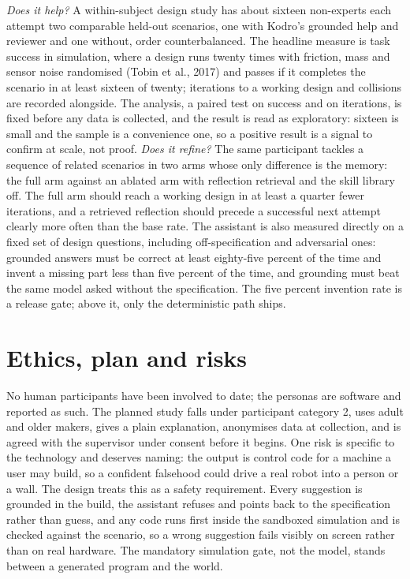 \documentclass[10.5pt]{article}
\begin{document}
\emph{Does it help?} A within-subject design study has about sixteen non-experts each attempt two comparable held-out scenarios, one with Kodro's grounded help and reviewer and one without, order counterbalanced. The headline measure is task success in simulation, where a design runs twenty times with friction, mass and sensor noise randomised (Tobin et al., 2017) and passes if it completes the scenario in at least sixteen of twenty; iterations to a working design and collisions are recorded alongside. The analysis, a paired test on success and on iterations, is fixed before any data is collected, and the result is read as exploratory: sixteen is small and the sample is a convenience one, so a positive result is a signal to confirm at scale, not proof. \emph{Does it refine?} The same participant tackles a sequence of related scenarios in two arms whose only difference is the memory: the full arm against an ablated arm with reflection retrieval and the skill library off. The full arm should reach a working design in at least a quarter fewer iterations, and a retrieved reflection should precede a successful next attempt clearly more often than the base rate. The assistant is also measured directly on a fixed set of design questions, including off-specification and adversarial ones: grounded answers must be correct at least eighty-five percent of the time and invent a missing part less than five percent of the time, and grounding must beat the same model asked without the specification. The five percent invention rate is a release gate; above it, only the deterministic path ships.

\section{Ethics, plan and risks}
No human participants have been involved to date; the personas are software and reported as such. The planned study falls under participant category 2, uses adult and older makers, gives a plain explanation, anonymises data at collection, and is agreed with the supervisor under consent before it begins. One risk is specific to the technology and deserves naming: the output is control code for a machine a user may build, so a confident falsehood could drive a real robot into a person or a wall. The design treats this as a safety requirement. Every suggestion is grounded in the build, the assistant refuses and points back to the specification rather than guess, and any code runs first inside the sandboxed simulation and is checked against the scenario, so a wrong suggestion fails visibly on screen rather than on real hardware. The mandatory simulation gate, not the model, stands between a generated program and the world.
\end{document}
